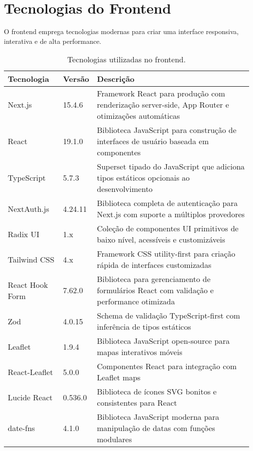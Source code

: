\section{Tecnologias do Frontend}

O frontend emprega tecnologias modernas para criar uma interface responsiva, interativa e de alta performance.

\begin{table}[H]
\centering
\caption{Tecnologias utilizadas no frontend.}
\label{tab:tecnologias-frontend}
\begin{tabular}{|p{3cm}|p{2cm}|p{8cm}|}
\hline
\textbf{Tecnologia} & \textbf{Versão} & \textbf{Descrição} \\
\hline
Next.js & 15.4.6 & Framework React para produção com renderização server-side, App Router e otimizações automáticas \\
\hline
React & 19.1.0 & Biblioteca JavaScript para construção de interfaces de usuário baseada em componentes \\
\hline
TypeScript & 5.7.3 & Superset tipado do JavaScript que adiciona tipos estáticos opcionais ao desenvolvimento \\
\hline
NextAuth.js & 4.24.11 & Biblioteca completa de autenticação para Next.js com suporte a múltiplos provedores \\
\hline
Radix UI & 1.x & Coleção de componentes UI primitivos de baixo nível, acessíveis e customizáveis \\
\hline
Tailwind CSS & 4.x & Framework CSS utility-first para criação rápida de interfaces customizadas \\
\hline
React Hook Form & 7.62.0 & Biblioteca para gerenciamento de formulários React com validação e performance otimizada \\
\hline
Zod & 4.0.15 & Schema de validação TypeScript-first com inferência de tipos estáticos \\
\hline
Leaflet & 1.9.4 & Biblioteca JavaScript open-source para mapas interativos móveis \\
\hline
React-Leaflet & 5.0.0 & Componentes React para integração com Leaflet maps \\
\hline
Lucide React & 0.536.0 & Biblioteca de ícones SVG bonitos e consistentes para React \\
\hline
date-fns & 4.1.0 & Biblioteca JavaScript moderna para manipulação de datas com funções modulares \\
\hline
\end{tabular}
\end{table}

